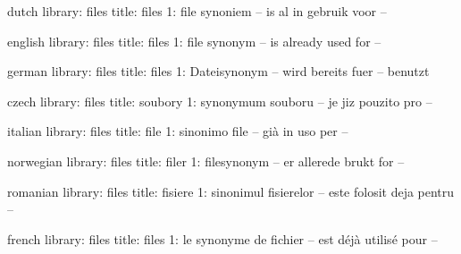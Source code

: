 

\unprotect

%

\startmessages  dutch  library: files
   title: files
       1: file synoniem -- is al in gebruik voor --
\stopmessages

\startmessages  english  library: files
   title: files
       1: file synonym -- is already used for --
\stopmessages

\startmessages  german  library: files
   title: files
       1: Dateisynonym -- wird bereits fuer -- benutzt
\stopmessages

\startmessages  czech  library: files
   title: soubory
       1: synonymum souboru -- je jiz pouzito pro --
\stopmessages

\startmessages  italian  library: files
   title: file
       1: sinonimo file -- già in uso per --
\stopmessages

\startmessages  norwegian  library: files
   title: filer
       1: filesynonym -- er allerede brukt for --
\stopmessages

\startmessages  romanian  library: files
   title: fisiere
       1: sinonimul fisierelor -- este folosit deja pentru --
\stopmessages

\startmessages  french  library: files
   title: files
       1: le synonyme de fichier -- est déjà utilisé pour --
\stopmessages



